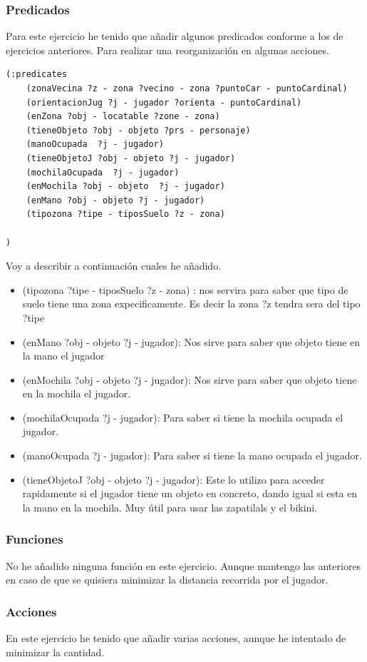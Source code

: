 \documentclass[12pt,a4paper]{article}
\begin{document}
\subsubsection{Predicados}
Para este ejercicio he tenido que añadir algunos predicados conforme a los de ejercicios anteriores. Para realizar una reorganización en algunas acciones. 
\begin{lstlisting}
(:predicates 
	(zonaVecina ?z - zona ?vecino - zona ?puntoCar - puntoCardinal)
	(orientacionJug ?j - jugador ?orienta - puntoCardinal)
	(enZona ?obj - locatable ?zone - zona)
	(tieneObjeto ?obj - objeto ?prs - personaje)
	(manoOcupada  ?j - jugador)
	(tieneObjetoJ ?obj - objeto ?j - jugador)
	(mochilaOcupada  ?j - jugador)
	(enMochila ?obj - objeto  ?j - jugador)
	(enMano ?obj - objeto ?j - jugador)
	(tipozona ?tipe - tiposSuelo ?z - zona)

)
\end{lstlisting}
Voy a describir a continuación cuales he añadido. \\
\begin{itemize}
	\item (tipozona ?tipe - tiposSuelo ?z - zona) : nos servira para saber que tipo de suelo tiene una zona expecificamente. Es decir la zona ?z tendra sera del tipo ?tipe
	\item (enMano ?obj - objeto ?j - jugador): Nos sirve para saber que objeto tiene en la mano el jugador
	\item (enMochila ?obj - objeto  ?j - jugador): Nos sirve para saber que objeto tiene en la mochila el jugador. 
	\item (mochilaOcupada  ?j - jugador): Para saber si tiene la mochila ocupada el jugador. 
	\item (manoOcupada  ?j - jugador): Para saber si tiene la mano ocupada el jugador. 
	\item (tieneObjetoJ ?obj - objeto ?j - jugador): Este lo utilizo para acceder rapidamente si el jugador tiene un objeto en concreto, dando igual si esta en la mano en la mochila. Muy útil para usar las zapatilals y el bikini. 
\end{itemize}
\subsubsection{Funciones}
No he añadido ninguna función en este ejercicio. Aunque mantengo las anteriores en caso de que se quisiera minimizar la distancia recorrida por el jugador. 
\subsubsection{Acciones}
En este ejercicio he tenido que añadir varias acciones, aunque he intentado de minimizar la cantidad.
\end{document}
